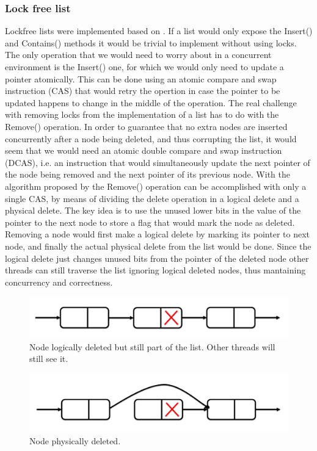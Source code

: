 \documentclass[11pt]{article}
\begin{document}
\subsubsection{Lock free list}
Lockfree lists were implemented based on
\cite{Harris}.  If a list would only expose the Insert() and Contains() methods
it would be trivial to implement without using locks. The only operation that we
would need to worry about in a concurrent environment is the Insert() one, for
which we would only need to update a pointer atomically. This can be done using
an atomic compare and swap instruction (CAS) that would retry the opertion in
case the pointer to be updated happens to change in the middle of the operation.
The real challenge with removing locks from the implementation of a list has to
do with the Remove() operation. In order to guarantee that no extra nodes are
inserted concurrently after a node being deleted, and thus corrupting the list,
it would seem that we would need an atomic double compare and swap instruction
(DCAS), i.e. an instruction that would simultaneously update the next pointer of
the node being removed and the next pointer of its previous node. With the
algorithm proposed by \cite{Harris} the Remove() operation can be accomplished
with only a single CAS, by means of dividing the delete operation in a logical
delete and a physical delete. The key idea is to use the unused lower bits in
the value of the pointer to the next node to store a flag that would mark the
node as deleted. Removing a node would first make a logical delete by marking
its pointer to next node, and finally the actual physical delete from the list
would be done. Since the logical delete just changes unused bits from the
pointer of the deleted node other threads can still traverse the list ignoring
logical deleted nodes, thus mantaining concurrency and correctness.

\begin{figure}[h]
\centering
\includegraphics[width=0.5\linewidth]{figs/patricio/logicallyDeleted.jpg}
\caption{Node logically deleted but still part of the list. Other threads will still see it.}
\label{fig:logicallyDeleted}
\end{figure}

\begin{figure}[h]
\centering
\includegraphics[width=0.5\linewidth]{figs/patricio/physicallyDeleted.jpg}
\caption{Node physically deleted.}
\label{fig:physicallyDeleted}
\end{figure}
\end{document}
